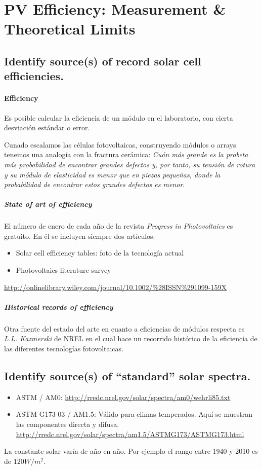 \section{PV Efficiency: Measurement \& Theoretical Limits}
\subsection{Identify source(s) of record solar cell efficiencies.}
\paragraph{Efficiency}
Es posible calcular la eficiencia de un módulo en el laboratorio, con cierta desviación estándar o error.

Cunado escalamos las células fotovoltaicas, construyendo módulos o arrays tenemos una analogía con la fractura cerámica:
{\em Cuán más grande es la probeta más probabilidad de encontrar grandes defectos y, por tanto, su tensión de rotura y su módulo de elasticidad es menor que en piezas pequeñas, donde la probabilidad de encontrar estos grandes defectos es menor}.
\subparagraph{State of art of efficiency}
El número de enero de cada año de la revista {\em Progress in Photovoltaics} es gratuito. En él se incluyen siempre dos artículos:
\begin{itemize}
	\item Solar cell efficiency tables: foto de la tecnología actual
	\item Photovoltaics literature survey
\end{itemize}
\url {http://onlinelibrary.wiley.com/journal/10.1002/\%28ISSN\%291099-159X}
\subparagraph{Historical records of efficiency}
Otra fuente del estado del arte en cuanto a eficiencias de módulos respecta es {\em L.L. Kazmerski} de NREL en el cual hace un recorrido histórico de la eficiencia de las diferentes tecnologías fotovoltaicas.

\subsection{Identify source(s) of “standard” solar spectra.}
\begin{itemize}
	\item ASTM / AM0: \url {http://rredc.nrel.gov/solar/spectra/am0/wehrli85.txt}
	\item ASTM G173-03 / AM1.5: Válido para climas temperados. Aquí se muestran las componentes directa y difusa. \url{http://rredc.nrel.gov/solar/spectra/am1.5/ASTMG173/ASTMG173.html}	
\end{itemize}
La constante solar varía de año en año. Por ejemplo el rango entre 1940 y 2010 es de $ 120 W/m^2 $.

